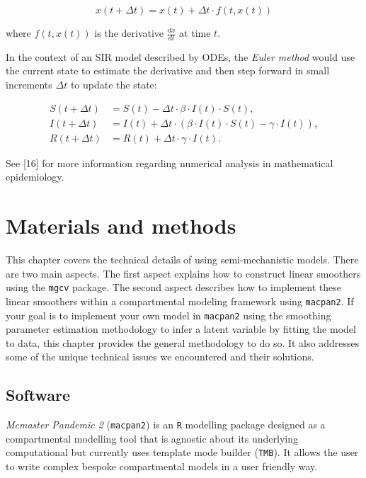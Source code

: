\documentclass[
11pt, %
oneside, %
english, %
singlespacing, %
]{macthesis} %
\begin{document}
\[
x(t+\Delta t) = x(t) + \Delta t \cdot f(t, x(t))
\]

where \(f(t, x(t))\) is the derivative \(\frac{dx}{dt}\) at time \(t\).

In the context of an SIR model described by ODEs, the \emph{Euler method} would use the current state to estimate the derivative and then step forward in small increments \(\Delta t\) to update the state:

\begin{equation}
\begin{aligned}
S(t+\Delta t) &= S(t) - \Delta t \cdot \beta \cdot I(t) \cdot S(t), \\
I(t+\Delta t) &= I(t) + \Delta t \cdot (\beta \cdot I(t) \cdot S(t) - \gamma \cdot I(t)), \\
R(t+\Delta t) &= R(t) + \Delta t \cdot \gamma \cdot I(t).
\end{aligned}
\label{eq:euler_sir}
\end{equation}

See {[}16{]} for more information regarding numerical analysis in mathematical epidemiology.

\chapter{Materials and methods}\label{Materials-and-methods}

This chapter covers the technical details of using semi-mechanistic models. There are two main aspects. The first aspect explains how to construct linear smoothers using the \texttt{mgcv} package. The second aspect describes how to implement these linear smoothers within a compartmental modeling framework using \texttt{macpan2}. If your goal is to implement your own model in \texttt{macpan2} using the smoothing parameter estimation methodology to infer a latent variable by fitting the model to data, this chapter provides the general methodology to do so. It also addresses some of the unique technical issues we encountered and their solutions.

\section{Software}\label{Software}

\emph{Mcmaster Pandemic 2} (\texttt{macpan2}) is an \texttt{R} modelling package designed as a compartmental modelling tool that is agnostic about its underlying computational but currently uses template mode builder (\texttt{TMB}). It allows the user to write complex bespoke compartmental models in a user friendly way.
\end{document}
